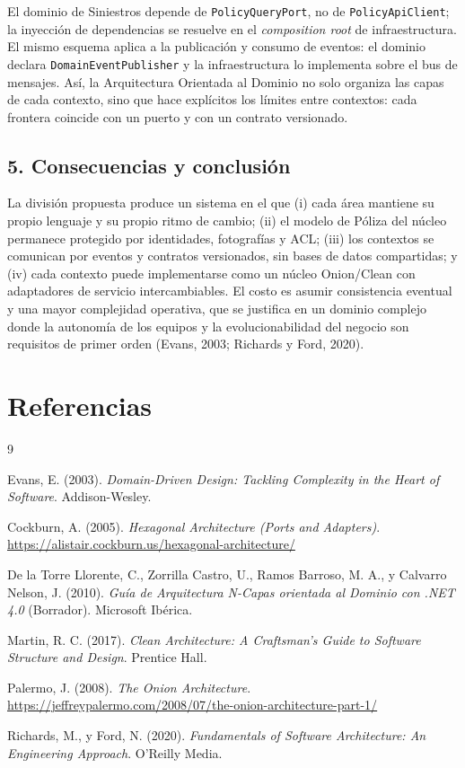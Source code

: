 \documentclass[11pt,a4paper]{article}
\begin{document}
El dominio de Siniestros depende de \texttt{PolicyQueryPort}, no de
\texttt{PolicyApiClient}; la inyección de dependencias se resuelve en el
\emph{composition root} de infraestructura. El mismo esquema aplica a la publicación y
consumo de eventos: el dominio declara \texttt{DomainEventPublisher} y la infraestructura
lo implementa sobre el bus de mensajes. Así, la Arquitectura Orientada al Dominio no solo
organiza las capas de cada contexto, sino que hace explícitos los límites entre contextos:
cada frontera coincide con un puerto y con un contrato versionado.

\subsection*{5. Consecuencias y conclusión}

La división propuesta produce un sistema en el que (i) cada área mantiene su propio
lenguaje y su propio ritmo de cambio; (ii) el modelo de Póliza del núcleo permanece
protegido por identidades, fotografías y ACL; (iii) los contextos se comunican por eventos
y contratos versionados, sin bases de datos compartidas; y (iv) cada contexto puede
implementarse como un núcleo Onion/Clean con adaptadores de servicio intercambiables. El
costo es asumir consistencia eventual y una mayor complejidad operativa, que se justifica
en un dominio complejo donde la autonomía de los equipos y la evolucionabilidad del
negocio son requisitos de primer orden (Evans, 2003; Richards y Ford, 2020).

\section*{Referencias}

\begin{thebibliography}{9}
\setlength{\itemsep}{2pt}

Evans, E. (2003). \emph{Domain-Driven Design: Tackling Complexity in the Heart of
Software}. Addison-Wesley.

Cockburn, A. (2005). \emph{Hexagonal Architecture (Ports and Adapters)}.
\url{https://alistair.cockburn.us/hexagonal-architecture/}

De la Torre Llorente, C., Zorrilla Castro, U., Ramos Barroso, M. A., y Calvarro Nelson, J.
(2010). \emph{Guía de Arquitectura N-Capas orientada al Dominio con .NET 4.0}
(Borrador). Microsoft Ibérica.

Martin, R. C. (2017). \emph{Clean Architecture: A Craftsman's Guide to Software Structure
and Design}. Prentice Hall.

Palermo, J. (2008). \emph{The Onion Architecture}.
\url{https://jeffreypalermo.com/2008/07/the-onion-architecture-part-1/}

Richards, M., y Ford, N. (2020). \emph{Fundamentals of Software Architecture: An
Engineering Approach}. O'Reilly Media.

\end{thebibliography}
\end{document}
